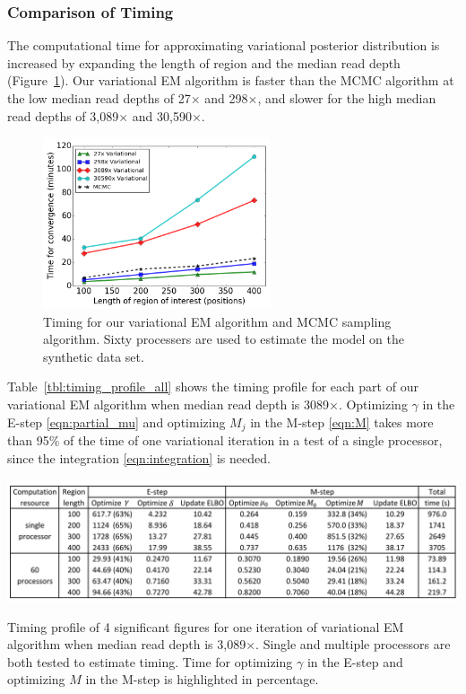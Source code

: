 \documentclass[11pt,reqno]{amsart}
\begin{document}
\subsubsection{Comparison of Timing}
The computational time for approximating variational posterior distribution is increased by expanding the length of region and the median read depth (Figure~\ref{tbl:timing_mcmc_var}).
Our variational EM algorithm is faster than the MCMC algorithm at the low median read depths of 27$\times$ and 298$\times$, and slower for the high median read depths of 3,089$\times$ and 30,590$\times$.
\begin{figure}[ht]
\centering
\includegraphics[width=0.6\textwidth]{figs/timing_var_mcmc.png}
\caption{Timing for our variational EM algorithm and MCMC sampling algorithm.
Sixty processers are used to estimate the model on the synthetic data set.}
\label{tbl:timing_mcmc_var}
\end{figure}
Table~\ref{tbl:timing_profile_all} shows the timing profile for each part of our variational EM algorithm when median read depth is 3089$\times$.
Optimizing $\gamma$ in the E-step \eqref{eqn:partial_mu} and optimizing $M_j$ in the M-step \eqref{eqn:M} takes more than 95\% of the time of one variational iteration in a test of a single processor, since the integration \eqref{eqn:integration} is needed.
\begin{table}[htbp]
\centering
\vspace{10pt}
\includegraphics[width=1.0\textwidth]{tables/time_3089X_all_update.png}
\caption{Timing profile of 4 significant figures for one iteration of variational EM algorithm when median read depth is 3,089$\times$.
Single and multiple processors are both tested to estimate timing. Time for optimizing $\gamma$ in the E-step and optimizing $M$ in the M-step is highlighted in percentage.}
\label{tbl:timing_profile_all}
\end{table}
\end{document}
